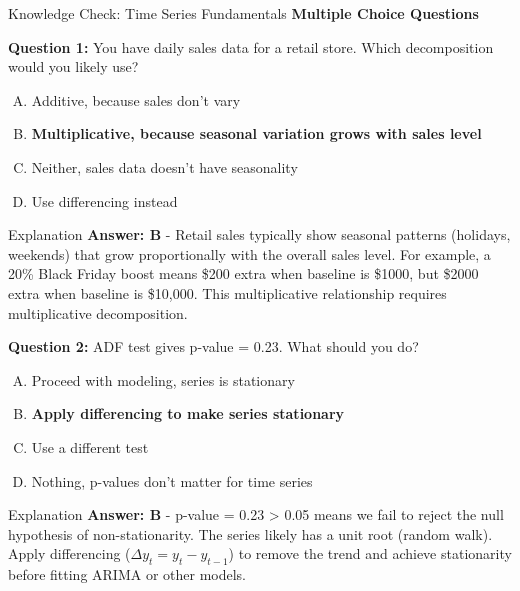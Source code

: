 \begin{frame}{Knowledge Check: Time Series Fundamentals}
\textbf{Multiple Choice Questions}

\vspace{0.3cm}

\textbf{Question 1:} You have daily sales data for a retail store. Which decomposition would you likely use?

\begin{enumerate}[A)]
\item Additive, because sales don't vary
\item \textcolor{forest}{\textbf{Multiplicative, because seasonal variation grows with sales level}}
\item Neither, sales data doesn't have seasonality
\item Use differencing instead
\end{enumerate}

\pause

\begin{block}{Explanation}
\textcolor{forest}{\textbf{Answer: B}} - Retail sales typically show seasonal patterns (holidays, weekends) that grow proportionally with the overall sales level. For example, a 20\% Black Friday boost means \$200 extra when baseline is \$1000, but \$2000 extra when baseline is \$10,000. This multiplicative relationship requires multiplicative decomposition.
\end{block}

\pause

\vspace{0.2cm}

\textbf{Question 2:} ADF test gives p-value = 0.23. What should you do?

\begin{enumerate}[A)]
\item Proceed with modeling, series is stationary
\item \textcolor{forest}{\textbf{Apply differencing to make series stationary}}
\item Use a different test
\item Nothing, p-values don't matter for time series
\end{enumerate}

\pause

\begin{block}{Explanation}
\textcolor{forest}{\textbf{Answer: B}} - p-value = 0.23 > 0.05 means we fail to reject the null hypothesis of non-stationarity. The series likely has a unit root (random walk). Apply differencing ($\Delta y_t = y_t - y_{t-1}$) to remove the trend and achieve stationarity before fitting ARIMA or other models.
\end{block}
\end{frame}

